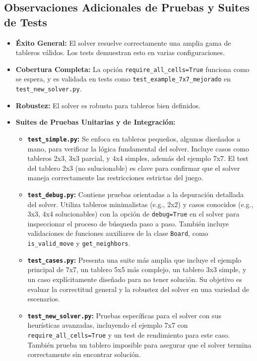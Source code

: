 \documentclass[spanish]{article}
\numberwithin{equation}{section}
\numberwithin{figure}{section}
\theoremstyle{definition}
\begin{document}
\subsection{Observaciones Adicionales de Pruebas y Suites de Tests}
\begin{itemize}
    \item \textbf{Éxito General:} El solver resuelve correctamente una amplia gama de tableros válidos. Los tests demuestran esto en varias configuraciones.
    \item \textbf{Cobertura Completa:} La opción \texttt{require\_all\_cells=True} funciona como se espera, y es validada en tests como \texttt{test\_example\_7x7\_mejorado} en \texttt{test\_new\_solver.py}.
    \item \textbf{Robustez:} El solver es robusto para tableros bien definidos.
    \item \textbf{Suites de Pruebas Unitarias y de Integración:}
        \begin{itemize}
            \item \textbf{\texttt{test\_simple.py}:} Se enfoca en tableros pequeños, algunos diseñados a mano, para verificar la lógica fundamental del solver. Incluye casos como tableros 2x3, 3x3 parcial, y 4x4 simples, además del ejemplo 7x7. El test del tablero 2x3 (no sulucionable) es clave para confirmar que el solver maneja correctamente las restricciones estrictas del juego.
            \item \textbf{\texttt{test\_debug.py}:} Contiene pruebas orientadas a la depuración detallada del solver. Utiliza tableros minimalistas (e.g., 2x2) y casos conocidos (e.g., 3x3, 4x4 solucionables) con la opción de \texttt{debug=True} en el solver para inspeccionar el proceso de búsqueda paso a paso. También incluye validaciones de funciones auxiliares de la clase \texttt{Board}, como \texttt{is\_valid\_move} y \texttt{get\_neighbors}.
            \item \textbf{\texttt{test\_cases.py}:} Presenta una suite más amplia que incluye el ejemplo principal de 7x7, un tablero 5x5 más complejo, un tablero 3x3 simple, y un caso explícitamente diseñado para no tener solución. Su objetivo es evaluar la correctitud general y la robustez del solver en una variedad de escenarios.
            \item \textbf{\texttt{test\_new\_solver.py}:} Pruebas específicas para el solver con sus heurísticas avanzadas, incluyendo el ejemplo 7x7 con \texttt{require\_all\_cells=True} y un test de rendimiento para este caso. También prueba un tablero imposible para asegurar que el solver termina correctamente sin encontrar solución.
        \end{itemize}
\end{itemize}
\end{document}
